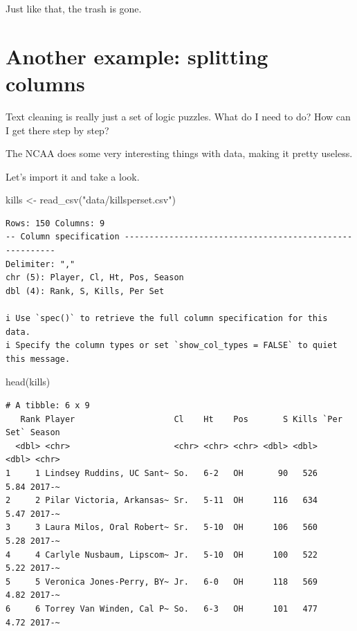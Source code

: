 \documentclass[
  letterpaper,
  DIV=11,
  numbers=noendperiod]{scrreprt}
\newenvironment{Shaded}{\begin{snugshade}}{\end{snugshade}}
\newcommand{\FunctionTok}[1]{\textcolor[rgb]{0.28,0.35,0.67}{#1}}
\newcommand{\NormalTok}[1]{\textcolor[rgb]{0.00,0.23,0.31}{#1}}
\newcommand{\OtherTok}[1]{\textcolor[rgb]{0.00,0.23,0.31}{#1}}
\newcommand{\StringTok}[1]{\textcolor[rgb]{0.13,0.47,0.30}{#1}}
\begin{document}
Just like that, the trash is gone.

\hypertarget{another-example-splitting-columns}{%
\section{Another example: splitting
columns}\label{another-example-splitting-columns}}

Text cleaning is really just a set of logic puzzles. What do I need to
do? How can I get there step by step?

The NCAA does some very interesting things with data, making it pretty
useless.

Let's import it and take a look.

\begin{Shaded}
\begin{Highlighting}[]
\NormalTok{kills }\OtherTok{\textless{}{-}} \FunctionTok{read\_csv}\NormalTok{(}\StringTok{"data/killsperset.csv"}\NormalTok{)}
\end{Highlighting}
\end{Shaded}

\begin{verbatim}
Rows: 150 Columns: 9
-- Column specification --------------------------------------------------------
Delimiter: ","
chr (5): Player, Cl, Ht, Pos, Season
dbl (4): Rank, S, Kills, Per Set

i Use `spec()` to retrieve the full column specification for this data.
i Specify the column types or set `show_col_types = FALSE` to quiet this message.
\end{verbatim}

\begin{Shaded}
\begin{Highlighting}[]
\FunctionTok{head}\NormalTok{(kills)}
\end{Highlighting}
\end{Shaded}

\begin{verbatim}
# A tibble: 6 x 9
   Rank Player                    Cl    Ht    Pos       S Kills `Per Set` Season
  <dbl> <chr>                     <chr> <chr> <chr> <dbl> <dbl>     <dbl> <chr> 
1     1 Lindsey Ruddins, UC Sant~ So.   6-2   OH       90   526      5.84 2017-~
2     2 Pilar Victoria, Arkansas~ Sr.   5-11  OH      116   634      5.47 2017-~
3     3 Laura Milos, Oral Robert~ Sr.   5-10  OH      106   560      5.28 2017-~
4     4 Carlyle Nusbaum, Lipscom~ Jr.   5-10  OH      100   522      5.22 2017-~
5     5 Veronica Jones-Perry, BY~ Jr.   6-0   OH      118   569      4.82 2017-~
6     6 Torrey Van Winden, Cal P~ So.   6-3   OH      101   477      4.72 2017-~
\end{verbatim}
\end{document}
